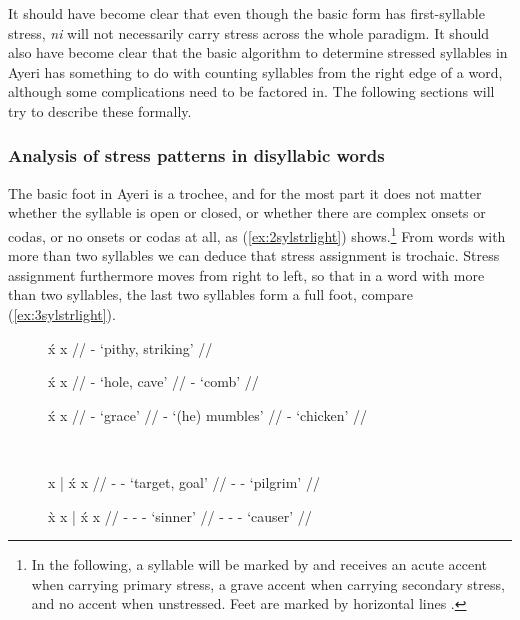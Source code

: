 It should have become clear that even though the basic form 
has first-syllable stress, \textit{ni} will not necessarily carry stress across
the whole paradigm. It should also have become clear that the basic algorithm
to determine stressed syllables in Ayeri has something to do with counting
syllables from the right edge of a word, although some complications need to be
factored in. The following sections will try to describe these formally.

\subsubsection{Analysis of stress patterns in disyllabic words}

The basic foot in Ayeri is a trochee, and for the most part it does not matter
whether the syllable is open or closed, or whether there are complex onsets or
codas, or no onsets or codas at all, as (\ref{ex:2sylstrlight})
shows.\footnote{In the following, a syllable will be marked by  and
receives an acute accent  when carrying primary stress, a grave accent
\orth{\`{}} when carrying secondary stress, and no accent when unstressed. Feet
are marked by horizontal lines \orth{|}.\label{fn:scansion}} From words with
more than two syllables we can deduce that stress assignment is trochaic.
Stress assignment furthermore moves from right to left, so that in a word with
more than two syllables, the last two syllables form a full foot, compare
(\ref{ex:3sylstrlight}).

\begin{figure}
\begin{minipage}[t]{.5\linewidth}
\pex[everygla=\upshape]\label{ex:2sylstrlight}
\a\begingl
	\gla x́		{}	x	{} //
	\glb {}	-	 {`pithy, striking'} //
\endgl

\a\begingl
	\gla x́		{}	x		{} //
	\glb {}	-		{`hole, cave'} //
	\glb {}	-			{`comb'} //
\endgl

\a\begingl
	\gla x́		{}	x		{} //
	\glb {}	-			{`grace'} //
	\glb {}	-		{`(he) mumbles'} //
	\glb {}	-			{`chicken'} //
\endgl
\xe
\end{minipage}
~
\begin{minipage}[t]{.5\linewidth}
\pex[everygla=\upshape]\label{ex:3sylstrlight}
\a\begingl
	\gla x		|	x́		{}	x	 	{} //
	\glb {}	-			-		{`target, goal'} //
	\glb {}	-			-			{`pilgrim'} //
\endgl

\a\label{ex:4sylstress}\begingl
	\gla x̀		{}	x		|	x́		{}	
x		{} //
	\glb {}	-			-			-	
		{`sinner'} //
	\glb {}	-			-			-	
		{`causer'} //
\endgl
\xe
\end{minipage}
\end{figure}

